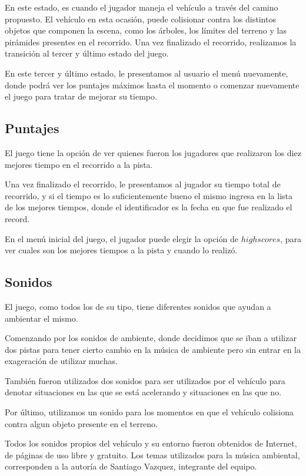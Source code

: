 \documentclass[a4paper,10pt]{article}
\begin{document}
En este estado, es cuando el jugador maneja el veh\'iculo a trav\'es del camino
propuesto.  El veh\'iculo en esta ocasi\'on, puede colisionar contra los
distintos
objetos que componen la escena, como los \'arboles, los l\'imites del terreno y
las
pir\'amides presentes en el recorrido.  Una vez finalizado el recorrido,
realizamos la transici\'on al tercer y \'ultimo estado del juego.

En este tercer y \'ultimo estado, le presentamos al usuario el men\'u
nuevamente,
donde podr\'a ver los puntajes m\'aximos hasta el momento o comenzar nuevamente
el
juego para tratar de mejorar su tiempo.

\subsection{Puntajes}
El juego tiene la opci\'on de ver quienes fueron los jugadores que realizaron
los
diez mejores tiempo en el recorrido a la pista.

Una vez finalizado el recorrido, le presentamos al jugador su tiempo total
de
recorrido, y si el tiempo es lo suficientemente bueno el mismo ingresa en la
lista de los mejores tiempos, donde el identificador es la fecha en que fue
realizado el record.

En el men\'u inicial del juego, el jugador puede elegir la opci\'on de
$highscores$,
para ver cuales son los mejores tiempos a la pista y cuando lo realiz\'o.


\subsection{Sonidos}
El juego, como todos los de su tipo, tiene diferentes sonidos que ayudan a
ambientar el mismo.

Comenzando por los sonidos de ambiente, donde decidimos que se iban a
utilizar
dos pistas para tener cierto cambio en la m\'usica de ambiente pero sin entrar
en
la exageraci\'on de utilizar muchas.

Tambi\'en fueron utilizados dos sonidos para ser utilizados por el veh\'iculo
para
denotar situaciones en las que se est\'a acelerando y situaciones en las que no.

Por \'ultimo, utilizamos un sonido para los momentos en que el veh\'iculo
colisiona contra algun objeto presente en el terreno.

Todos los sonidos propios del veh\'iculo y su entorno fueron obtenidos de
Internet, de p\'aginas de uso libre y gratuito.  Los temas utilizados para la
m\'usica ambiental, corresponden a la autor\'ia de Santiago Vazquez, integrante
del
equipo.
\end{document}
